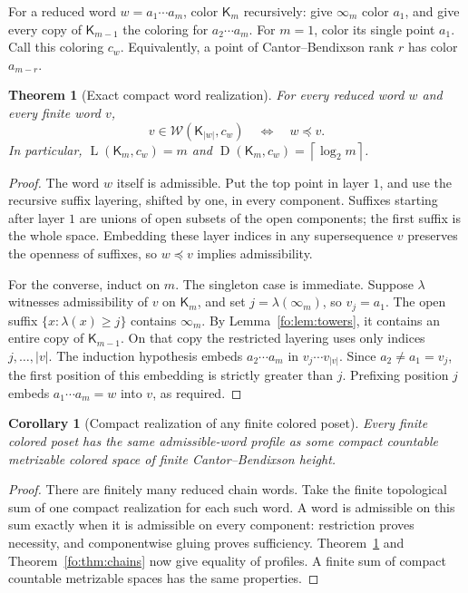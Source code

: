 \documentclass[11pt,letterpaper]{article}
\numberwithin{equation}{section}
\newtheorem{theorem}{Theorem}[section]
\newtheorem{corollary}[corollary]{Corollary}
\theoremstyle{definition}
\theoremstyle{remark}
\theoremstyle{definition}
\newcommand{\ceil}[1]{\left\lceil#1\right\rceil}
\newcommand{\W}{\mathcal W}
\newcommand{\depth}{\operatorname{D}}
\newcommand{\layers}{\operatorname{L}}
\newcommand{\len}[1]{\lvert #1\rvert}
\newcommand{\subseq}{\preccurlyeq}
\newcommand{\Tw}{\mathsf K}
\begin{document}
For a reduced word $w=a_1\cdots a_m$, color $\Tw_m$ recursively: give
$\infty_m$ color $a_1$, and give every copy of $\Tw_{m-1}$ the coloring for
$a_2\cdots a_m$. For $m=1$, color its single point $a_1$. Call this coloring
$c_w$. Equivalently, a point of Cantor--Bendixson rank $r$ has color $a_{m-r}$.

\begin{theorem}[Exact compact word realization]\label{fo:thm:compact}
For every reduced word $w$ and every finite word $v$,
\begin{equation}\label{fo:eq:compact-profile}
 v\in\W(\Tw_{\len{w}},c_w)\quad\Longleftrightarrow\quad w\subseq v.
\end{equation}
In particular, $\layers(\Tw_m,c_w)=m$ and
$\depth(\Tw_m,c_w)=\ceil{\log_2m}$.
\end{theorem}
\begin{proof}
The word $w$ itself is admissible. Put the top point in layer $1$, and use the
recursive suffix layering, shifted by one, in every component. Suffixes starting
after layer $1$ are unions of open subsets of the open components; the first
suffix is the whole space. Embedding these layer indices in any supersequence
$v$ preserves the openness of suffixes, so $w\subseq v$ implies admissibility.

For the converse, induct on $m$. The singleton case is immediate. Suppose
$\lambda$ witnesses admissibility of $v$ on $\Tw_m$, and set
$j=\lambda(\infty_m)$, so $v_j=a_1$. The open suffix
$\{x:\lambda(x)\ge j\}$ contains $\infty_m$. By Lemma~\ref{fo:lem:towers}, it
contains an entire copy of $\Tw_{m-1}$. On that copy the restricted layering uses
only indices $j,\ldots,\len{v}$. The induction hypothesis embeds
$a_2\cdots a_m$ in $v_j\cdots v_{\len{v}}$. Since $a_2\ne a_1=v_j$, the first
position of this embedding is strictly greater than $j$. Prefixing position
$j$ embeds $a_1\cdots a_m=w$ into $v$, as required.
\end{proof}

\begin{corollary}[Compact realization of any finite colored poset]
Every finite colored poset has the same admissible-word profile as some compact
countable metrizable colored space of finite Cantor--Bendixson height.
\end{corollary}
\begin{proof}
There are finitely many reduced chain words. Take the finite topological sum of
one compact realization for each such word. A word is admissible on this sum
exactly when it is admissible on every component: restriction proves necessity,
and componentwise gluing proves sufficiency. Theorem~\ref{fo:thm:compact} and
Theorem~\ref{fo:thm:chains} now give equality of profiles. A finite sum of compact
countable metrizable spaces has the same properties.
\end{proof}
\end{document}
